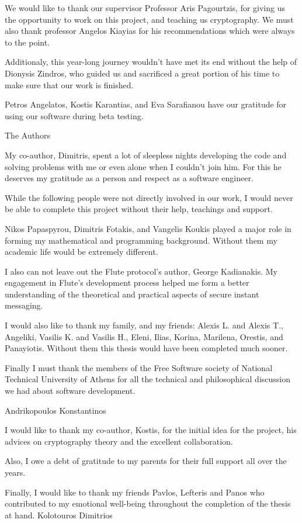 \documentclass[
11pt, %
english, %
singlespacing, %
parskip, %
headsepline, %
]{MastersDoctoralThesis} %
\begin{document}
\begin{acknowledgements}
\addchaptertocentry{\acknowledgementname} %

We would like to thank our supervisor Professor Aris Pagourtzis, for giving us the opportunity to work on this project, and teaching us cryptography.
We must also thank professor Angelos Kiayias for his recommendations which were always to the point.

Additionaly, this year-long journey wouldn't have met its end without the help of Dionysis Zindros, who guided us and sacrificed a great portion of his time to make sure that our work is finished.

Petros Angelatos, Kostis Karantias, and Eva Sarafianou have our gratitude for using our software during beta testing.

\bigbreak
\hfill The Authors

My co-author, Dimitris, spent a lot of sleepless nights developing the code and solving problems with me or even alone when I couldn't join him.
For this he deserves my gratitude as a person and respect as a software engineer.

While the following people were not directly involved in our work, I would never be able to complete this project without their help, teachings and support.

Nikos Papaspyrou, Dimitris Fotakis, and Vangelis Koukis played a major role in forming my mathematical and programming background.
Without them my academic life would be extremely different.

I also can not leave out the Flute protocol's author, George Kadianakis.
My engagement in Flute's development process helped me form a better understanding of the theoretical and practical aspects of secure instant messaging.

I would also like to thank my family, and my friends: Alexis L. and Alexis T., Angeliki, Vasilis K. and Vasilis H., Eleni, Ilias, Korina, Marilena, Orestis, and Panayiotis.
Without them this thesis would have been completed much sooner.

Finally I must thank the members of the Free Software society of National Technical University of Athens for all the technical and philosophical discussion we had about software development.

\bigbreak
\hfill Andrikopoulos Konstantinos

I would like to thank my co-author, Kostis, for the initial idea for the project, his advices on cryptography theory and the excellent collaboration.

Also, I owe a debt of gratitude to my parents for their full support all over the years.

Finally, I would like to thank my friends Pavlos, Lefteris and Panos who contributed to my emotional well-being throughout the completion of the thesis at hand.
\bigbreak
\hfill Kolotouros Dimitrios


\end{acknowledgements}
\end{document}
